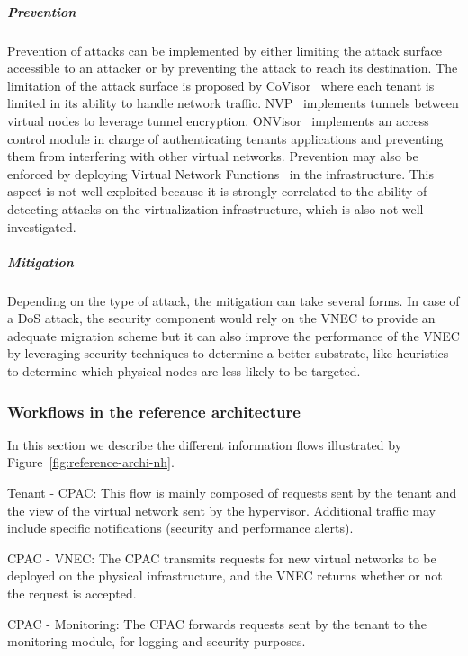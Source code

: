 \subparagraph{Prevention}
Prevention of attacks can be implemented by either limiting the attack surface accessible to an attacker or by preventing the attack to reach its destination. The limitation of the attack surface is proposed by CoVisor~\cite{CoVisor-Jin2015} where each tenant is limited in its ability to handle network traffic.
NVP~\cite{NVP-Koponen2014} implements tunnels between virtual nodes to leverage tunnel encryption.
ONVisor~\cite{ONVisor-Han2018} implements an access control module in charge of authenticating tenants applications and preventing them from interfering with other virtual networks.
Prevention may also be enforced by deploying Virtual Network Functions~\cite{vnf} in the infrastructure. This aspect is not well exploited because it is strongly correlated to the ability of detecting attacks on the virtualization infrastructure, which is also not well investigated. 

\subparagraph{Mitigation}
Depending on the type of attack, the mitigation can take several forms. 
In case of a DoS attack, the security component would rely on the VNEC to provide an adequate migration scheme but it can also improve the performance of the VNEC by leveraging security techniques to determine a better substrate, like heuristics to determine which physical nodes are less likely to be targeted. 

\subsubsection{Workflows in the reference architecture}
In this section we describe the different information flows illustrated by Figure~\ref{fig:reference-archi-nh}.

 Tenant - CPAC: This flow is mainly composed of requests sent by the tenant and the view of the virtual network sent by the hypervisor. Additional traffic may include specific notifications (\eg security and performance alerts).

 CPAC - VNEC: The CPAC transmits requests for new virtual networks to be deployed on the physical infrastructure, and the VNEC returns whether or not the request is accepted.

 CPAC - Monitoring: The CPAC forwards requests sent by the tenant to the monitoring module, for logging and security purposes. 

